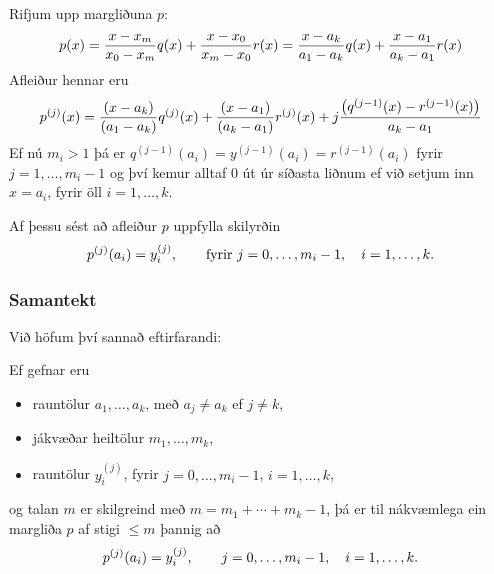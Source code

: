 \documentclass[a4paper,10pt,icelandic]{sphinxmanual}
\begin{document}
Rifjum upp margliðuna \(p\):
\begin{gather}
\begin{split}p(x) = \frac{x-x_m}{x_0-x_m}q(x)
  + \frac{x-x_0}{x_m-x_0}r(x)
  = \frac{x-a_k}{a_1-a_k}q(x)
  + \frac{x-a_1}{a_k-a_1}r(x)\end{split}\notag
\end{gather}
Afleiður hennar eru
\begin{gather}
\begin{split}p^{(j)}(x) = \frac{(x-a_k)}{(a_1-a_k)}q^{(j)}(x)
  + \frac{(x-a_1)}{(a_k-a_1)}r^{(j)}(x)
  + j \frac{\left( q^{(j-1)}(x)-r^{(j-1)}(x)\right)}{a_k-a_1}\end{split}\notag
\end{gather}
Ef nú \(m_i > 1\) þá er \(q^{(j-1)}(a_i) = y^{(j-1)}(a_i) =
r^{(j-1)}(a_i)\) fyrir \(j = 1, \ldots, m_i-1\) og því kemur alltaf
\(0\) út úr síðasta liðnum ef við setjum inn \(x = a_i\), fyrir
öll \(i = 1, \ldots, k\).

Af þessu sést að afleiður \(p\) uppfylla skilyrðin
\begin{gather}
\begin{split}p^{(j)}(a_i) = y^{(j)}_i, \qquad \text{fyrir } j=0,\ldots,m_i-1,
  \quad i=1,\ldots,k.\end{split}\notag
\end{gather}

\subsubsection{Samantekt}
\label{kafli03:id4}
Við höfum því sannað eftirfarandi:

Ef gefnar eru
\begin{itemize}
\item {} 
rauntölur \(a_1,\dots,a_k\), með \(a_j\neq a_k\) ef
\(j\neq k\),

\item {} 
jákvæðar heiltölur \(m_1,\dots,m_k\),

\item {} 
rauntölur \(y_i^{(j)}\), fyrir \(j=0,\dots, m_i-1\),
\(i=1,\dots,k\),

\end{itemize}

og talan \(m\) er skilgreind með \(m=m_1+\cdots+m_k-1\), þá er
til nákvæmlega ein margliða \(p\) af stigi \(\leq m\) þannig að
\begin{gather}
\begin{split}p^{(j)}(a_i)=y_i^{(j)}, \qquad j=0,\dots, m_i-1, \quad i=1,\dots,k.\end{split}\notag
\end{gather}
\end{document}

